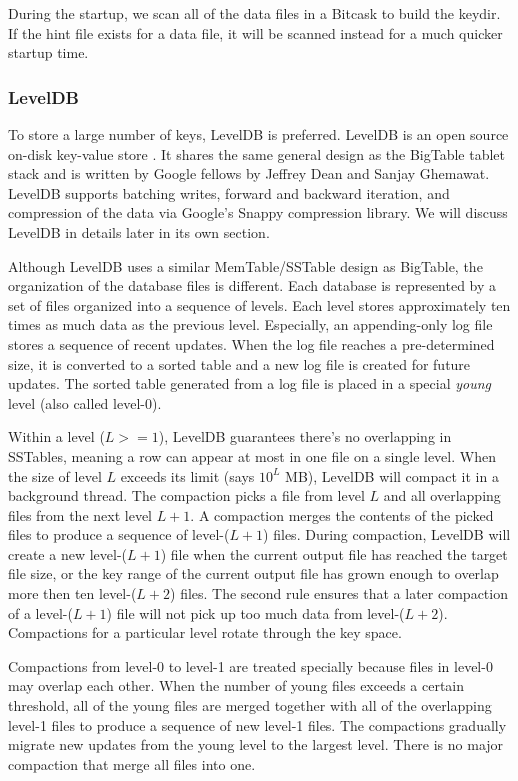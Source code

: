 \documentclass[11pt]{book}
\begin{document}
During the startup, we scan all of the data files in a Bitcask to build the keydir. If the hint file exists for a data file, it will be scanned instead for a much quicker startup time.

\subsubsection{LevelDB}
To store a large number of keys, LevelDB is preferred. LevelDB is an open source on-disk key-value store \cite{LevelDB}. It shares the same general design as the BigTable tablet stack and is written by Google fellows by Jeffrey Dean and Sanjay Ghemawat. LevelDB supports batching writes, forward and backward iteration, and compression of the data via Google's Snappy compression library. We will discuss LevelDB in details later in its own section.

Although LevelDB uses a similar MemTable/SSTable design as BigTable, the organization of the database files is different. Each database is represented by a set of files organized into a sequence of levels. Each level stores approximately ten times as much data as the previous level. Especially, an appending-only log file stores a sequence of recent updates. When the log file reaches a pre-determined size, it is converted to a sorted table and a new log file is created for future updates. The sorted table generated from a log file is placed in a special {\em young} level (also called level-0).

Within a level ($L > =1$), LevelDB guarantees there's no overlapping in SSTables, meaning a row can appear at most in one file on a single level. When the size of level $L$ exceeds its limit (says $10^L$ MB), LevelDB will compact it in a background thread. The compaction picks a file from level $L$ and all overlapping files from the next level $L+1$. A compaction merges the contents of the picked files to produce a sequence of level-($L+1$) files. During compaction, LevelDB will create a new level-($L+1$) file when the current output file has reached the target file size, or the key range of the current output file has grown enough to overlap more then ten level-($L+2$) files. The second rule ensures that a later compaction of a level-($L+1$) file will not pick up too much data from level-($L+2$). Compactions for a particular level rotate through the key space. 

Compactions from level-0 to level-1 are treated specially because files in level-0 may overlap each other. When the number of young files exceeds a certain threshold, all of the young files are merged together with all of the overlapping level-1 files to produce a sequence of new level-1 files. The compactions gradually migrate new updates from the young level to the largest level. There is no major compaction that merge all files into one.
\end{document}
